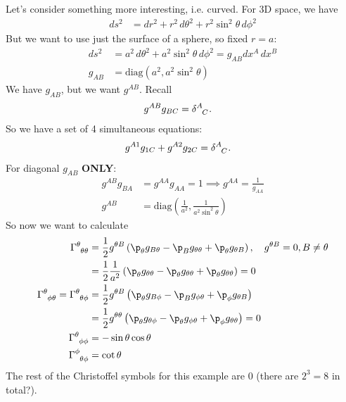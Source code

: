\documentclass[a4paper, 11pt, normalem]{report}
\begin{document}
Let's consider something more interesting, i.e. curved.
For 3D space, we have
\begin{align}
    ds^2 &= dr^2 + r^2\,d\theta^2 + r^2\sin^2\theta\,d\phi^2
\end{align}
But we want to use just the surface of a sphere, so fixed $r=a$:
\begin{align}
    ds^2 &= a^2\,d\theta^2 + a^2\sin^2\theta\,d\phi^2 = g_{AB}dx^A\,dx^B \\
    g_{AB} &= \text{diag}(a^2,a^2\sin^2\theta)
\end{align}
We have $g_{AB}$, but we want $g^{AB}$. Recall
\begin{align}
    g^{AB}g_{BC} &= \tensor{\delta}{^A_C}.
\end{align}
So we have a set of 4 simultaneous equations:
\begin{align}
    g^{A1}g_{1C} + g^{A2}g_{2C} &= \tensor{\delta}{^A_C}.
\end{align}
For diagonal $g_{AB}$ \textbf{ONLY}:
\begin{align}
    g^{AB}g_{BA} &= g^{AA}g_{AA} = 1 \implies g^{AA} = \frac{1}{g_{AA}} \\
    g^{AB} &= \text{diag}\left(\frac{1}{a^2},\frac{1}{a^2\sin^2\theta}\right)
\end{align}
So now we want to calculate
\begin{align}
    \tensor{\Gamma}{^\theta_{\theta\theta}} &= \frac12 g^{\theta B} \left(\p_\theta g_{B\theta} - \p_B g_{\theta\theta} + \p_{\theta} g_{\theta B}\right), \quad g^{\theta B} = 0, B\neq\theta \\
                                            &= \frac12 \frac{1}{a^2}\left(\p_{\theta} g_{\theta\theta} - \p_\theta g_{\theta\theta} + \p_\theta g_{\theta\theta}\right) =  0 \\
    \tensor{\Gamma}{^\theta_{\phi\theta}} = \tensor{\Gamma}{^\theta_{\theta\phi}} &= \frac12 g^{\theta B}\left(\p_\theta g_{B\phi} - \p_B g_{\phi\theta} + \p_\phi g_{\theta B}\right) \\
                                          &= \frac12 g^{\theta\theta}\left(\p_\theta g_{\theta\phi} - \p_\theta g_{\phi\theta} + \p_\phi g_{\theta\theta}\right) = 0 \\
    \tensor{\Gamma}{^\theta_{\phi\phi}} &= -\sin\theta\cos\theta \\
    \tensor{\Gamma}{^\phi_{\theta\phi}} &= \cot\theta
\end{align}
The rest of the Christoffel symbols for this example are 0 (there are $2^3=8$ in total?).
\end{document}
